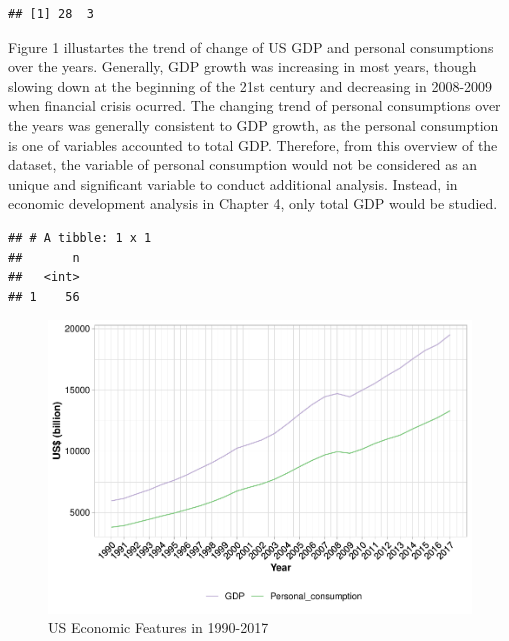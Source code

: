 \documentclass[12pt,]{article}
\newenvironment{Shaded}{\begin{snugshade}}{\end{snugshade}}
\newcommand{\KeywordTok}[1]{\textcolor[rgb]{0.13,0.29,0.53}{\textbf{#1}}}
\newcommand{\DecValTok}[1]{\textcolor[rgb]{0.00,0.00,0.81}{#1}}
\newcommand{\StringTok}[1]{\textcolor[rgb]{0.31,0.60,0.02}{#1}}
\newcommand{\CommentTok}[1]{\textcolor[rgb]{0.56,0.35,0.01}{\textit{#1}}}
\newcommand{\OperatorTok}[1]{\textcolor[rgb]{0.81,0.36,0.00}{\textbf{#1}}}
\newcommand{\NormalTok}[1]{#1}
\begin{document}
\begin{Shaded}
\end{Shaded}

\begin{verbatim}
## [1] 28  3
\end{verbatim}

Figure 1 illustartes the trend of change of US GDP and personal
consumptions over the years. Generally, GDP growth was increasing in
most years, though slowing down at the beginning of the 21st century and
decreasing in 2008-2009 when financial crisis ocurred. The changing
trend of personal consumptions over the years was generally consistent
to GDP growth, as the personal consumption is one of variables accounted
to total GDP. Therefore, from this overview of the dataset, the variable
of personal consumption would not be considered as an unique and
significant variable to conduct additional analysis. Instead, in
economic development analysis in Chapter 4, only total GDP would be
studied.

\begin{verbatim}
## # A tibble: 1 x 1
##       n
##   <int>
## 1    56
\end{verbatim}

\begin{figure}
\centering
\includegraphics{Project_Code_files/figure-latex/unnamed-chunk-3-1.pdf}
\caption{US Economic Features in 1990-2017}
\end{figure}
\end{document}
